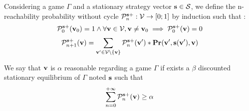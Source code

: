 \begin{mydef}
	Considering a game $\Gamma$ and a stationary strategy vector $\mathbf{s} \in \mathcal{S}$, 
	we define the n-reachability probability without cycle $\mathcal{P}^{\mathbf{s}+}_n : \mathcal{V} \rightarrow [0;1]$ by induction such that :
	$$\mathcal{P}^{\mathbf{s}+}_0(\mathbf{v}_0) = 1 \land \forall \mathbf{v} \in \mathcal{V},  \mathbf{v} \neq \mathbf{v}_0 \implies \mathcal{P}^{\mathbf{s}+}_0(\mathbf{v}) = 0$$
	$$\mathcal{P}^{\mathbf{s}+}_{n+1}(\mathbf{v}) = \sum_{\mathbf{v}' \in \mathcal{V} \setminus \{\mathbf{v}\}} \mathcal{P}^{\mathbf{s}+}_{n}(\mathbf{v}') * \mathbf{Pr}(\mathbf{v}',\mathbf{s}(\mathbf{v}'),\mathbf{v})$$
\end{mydef}

\begin{mydef}
	We say that $\mathbf{v}$ is $\alpha$ reasonable  regarding a game $\Gamma$ if exists a $\beta$ discounted stationary equilibrium of $\Gamma$ noted $\mathbf{s}$ such that $$\sum_{n=0}^{+\infty} \mathcal{P}^{\mathbf{s}+}_{n}(\mathbf{v}) \geq \alpha$$
\end{mydef}



